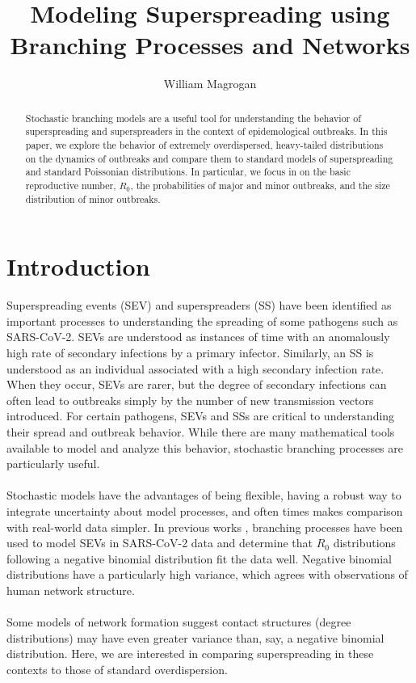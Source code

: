 \documentclass[11pt, twocolumn]{article}
\title{Modeling Superspreading using Branching Processes and Networks}
\author{William Magrogan}
\begin{document}
\maketitle

\begin{abstract}
Stochastic branching models are a useful tool for understanding the behavior of superspreading and superspreaders in the context of epidemological outbreaks. In this paper, we explore the behavior of extremely overdispersed, heavy-tailed distributions on the dynamics of outbreaks and compare them to standard models of superspreading and standard Poissonian distributions. In particular, we focus in on the basic reproductive number, $R_0$, the probabilities of major and minor outbreaks, and the size distribution of minor outbreaks.
\end{abstract}

\section*{Introduction}
Superspreading events (SEV) and superspreaders (SS) have been identified as important processes to understanding the spreading of some pathogens such as SARS-CoV-2. SEVs are understood as instances of time with an anomalously high rate of secondary infections by a primary infector. Similarly, an SS is understood as an individual associated with a high secondary infection rate. When they occur, SEVs are rarer, but the degree of secondary infections can often lead to outbreaks simply by the number of new transmission vectors introduced. For certain pathogens, SEVs and SSs are critical to understanding their spread and outbreak behavior. While there are many mathematical tools available to model and analyze this behavior, stochastic branching processes are particularly useful.\\ \\
Stochastic models have the advantages of being flexible, having a robust way to integrate uncertainty about model processes, and often times makes comparison with real-world data simpler. In previous works \cite{ijerph17176137}, branching processes have been used to model SEVs in SARS-CoV-2 data and determine that $R_0$ distributions following a negative binomial distribution fit the data well. Negative binomial distributions have a particularly high variance, which agrees with observations of human network structure. \\ \\
Some models of network formation \cite{RevModPhys.74.47} suggest contact structures (degree distributions) may have even greater variance than, say, a negative binomial distribution. Here, we are interested in comparing superspreading in these contexts to those of standard overdispersion.
\end{document}
